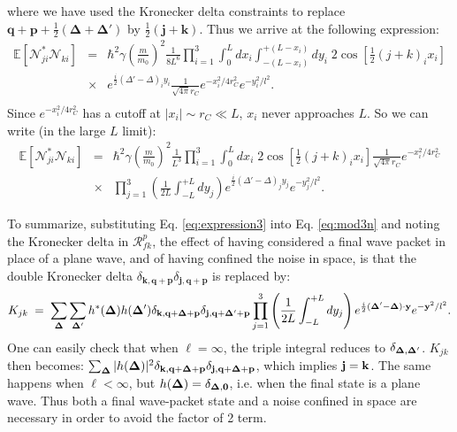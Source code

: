 \documentclass[12pt,onecolumn,amssymb,nofootinbib]{revtex4-2} %
\begin{document}
where we have used the Kronecker delta constraints to replace
$\mathbf{q+p}+\frac{1}{2}\left(\mathbf{\Delta+\Delta'}\right)$ by
$\frac{1}{2}\left(\mathbf{j+k}\right)$. Thus we arrive at the
following expression:
\begin{eqnarray}
\mathbb{E}[\mathcal{N}_{ji}^{*}\mathcal{N}_{ki}] &=&
\hbar^{2}\gamma\left(\frac{m}{m_{0}}\right)^{2}\frac{1}{8L^{6}}\prod_{i=1}^{3}\int_{0}^{L}\!\!\! dx_{i}\int_{-\left(L-x_{i}\right)}^{+\left(L-x_{i}\right)}\!\!\!\!\!\!\!\! dy_{i}\; 2\cos\!\left[\frac{1}{2}(j+k)_i x_i \right]\nonumber \\
&\times&
e^{\frac{i}{2}(\Delta'-\Delta)_iy_i}\frac{1}{\sqrt{4\pi}r_C}e^{-x_i^2/4r_C^2}e^{-y_i^2/l^2}.
\nonumber \\
& &
\end{eqnarray}
Since $e^{-x_i^2/4r_C^2}$ has a cutoff at $|x_i| \sim r_C \ll L$,
$x_i$ never approaches $L$. So we can write (in the large $L$
limit):
\begin{eqnarray}\label{eq:expression3}
\mathbb{E}[\mathcal{N}_{ji}^{*}\mathcal{N}_{ki}] & = & \hbar^{2}\gamma\left(\frac{m}{m_{0}}\right)^{2}\frac{1}{L^{3}}\prod_{i=1}^{3}\int_{0}^{L}dx_{i}\; 2\cos\left[\frac{1}{2}(j+k)_i x_i \right] \frac{1}{\sqrt{4\pi}r_C}e^{-x_i^2/4r_C^2} \nonumber \\
& \times & \prod_{j=1}^{3}\left(\frac{1}{2L}\int_{-L}^{+L}dy_{j}\right)
e^{\frac{i}{2}(\Delta'-\Delta)_j y_j} e^{-y_j^2/l^{2}}.
\end{eqnarray}

To summarize, substituting Eq. \eqref{eq:expression3} into Eq. \eqref{eq:mod3n} and noting the Kronecker delta in ${\mathcal R}_{fk}^{p}$,  the effect of having considered a final wave packet in place of a plane wave, and of having confined the noise in space, is that the double Kronecker delta $\delta_{\mathbf{k,q+p}} \delta_{\mathbf{j,q+p}}$ is replaced by:
\begin{equation} \label{eq:k1}
K_{jk} \; = \; \sum_{\bf \Delta} \sum_{\bf \Delta'} h^{*}({\bf \Delta}) h({\bf \Delta}') \delta_{\mathbf{k,q+\Delta+p}} \delta_{\mathbf{j,q+\Delta'+p}}\prod_{j=1}^{3}\left(\frac{1}{2L}\int_{-L}^{+L}dy_{j}\right)e^{\frac{i}{2}\mathbf{(\Delta'-\Delta)\cdot\mathbf{y}}}e^{-\mathbf{y}^{2}/l^{2}}.
\end{equation}
One can easily check that when $\ell = \infty$, the triple integral reduces to $\delta_{{\bf \Delta}, {\bf \Delta}'}$. $K_{jk}$ then becomes: $\sum_{\bf \Delta} | h({\bf \Delta})|^2 \delta_{\mathbf{k,q+\Delta+p}} \delta_{\mathbf{j,q+\Delta+p}}$, which implies ${\bf j} = {\bf k}$. The same happens when $\ell < \infty$, but $h({\bf \Delta}) = \delta_{{\bf \Delta}, {\bf 0}}$, i.e. when the final state is a plane wave. Thus both a final wave-packet state and a noise confined in space are necessary in order to avoid the factor of 2 term.
\end{document}
